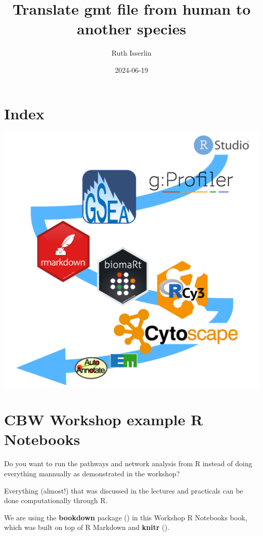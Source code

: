 \documentclass[
]{book}
\title{Translate gmt file from human to another species}
\author{Ruth Isserlin}
\date{2024-06-19}
\begin{document}
\maketitle

{
\setcounter{tocdepth}{1}
\tableofcontents
}
\chapter{Index}\label{index}

\includegraphics{./images/cover.png}

\chapter{CBW Workshop example R Notebooks}\label{intro}

Do you want to run the pathways and network analysis from R instead of doing everything mannually as demonstrated in the workshop?

Everything (almost!) that was discussed in the lectures and practicals can be done computationally through R.

We are using the \textbf{bookdown} package () in this Workshop R Notebooks book, which was built on top of R Markdown and \textbf{knitr} ().
\end{document}
